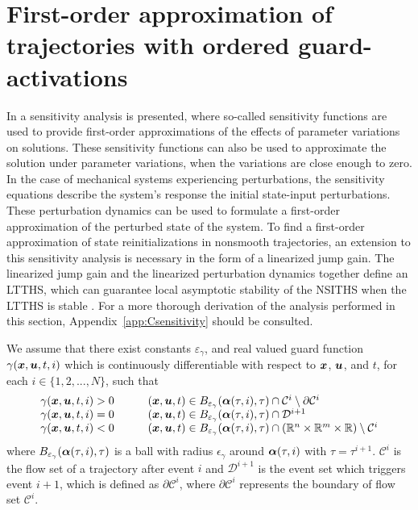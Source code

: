 \documentclass[../DC2017114Bouma.tex]{subfiles}
\begin{document}
\section{First-order approximation of trajectories with ordered guard-activations}
In \cite{Khalil1996} a sensitivity analysis is presented, where so-called sensitivity functions are used to provide first-order approximations of the effects of parameter variations on solutions. These sensitivity functions can also be used to approximate the solution under parameter variations, when the variations are close enough to zero. In the case of mechanical systems experiencing perturbations, the sensitivity equations describe the system's response the initial state-input perturbations. These perturbation dynamics can be used to formulate a first-order approximation of the perturbed state of the system. To find a first-order approximation of state reinitializations in nonsmooth trajectories, an extension to this sensitivity analysis is necessary in the form of a linearized jump gain. The linearized jump gain and the linearized perturbation dynamics together define an LTTHS, which can guarantee local asymptotic stability of the NSITHS when the LTTHS is stable \cite{Rijnen2017}. For a more thorough derivation of the analysis performed in this section, Appendix~\ref{app:Csensitivity} should be consulted.

\begin{myass}\label{ass:existence}
We assume that there exist constants $\varepsilon_\gamma$, and real valued guard function $\gamma({\boldsymbol{x}},{\boldsymbol{u}},t,i)$ which is continuously differentiable with respect to ${\boldsymbol{x}}$, ${\boldsymbol{u}}$, and $t$, for each $i\in \{1,2,...,N\}$, such that
\begin{equation}
\begin{array}{llll}
\gamma({\boldsymbol{x}},{\boldsymbol{u}},t,i) > 0 & &	&({\boldsymbol{x}},{\boldsymbol{u}},t) \in B_{\varepsilon_\gamma}(\boldsymbol{\alpha}(\tau,i),\tau)\cap \mathcal{C}^i\setminus\partial \mathcal{C}^i\\
\gamma({\boldsymbol{x}},{\boldsymbol{u}},t,i) = 0 & &	&({\boldsymbol{x}},{\boldsymbol{u}},t) \in B_{\varepsilon_\gamma}(\boldsymbol{\alpha}(\tau,i),\tau)\cap \mathcal{D}^{i+1}\\
\gamma({\boldsymbol{x}},{\boldsymbol{u}},t,i) < 0 & &	&({\boldsymbol{x}},{\boldsymbol{u}},t) \in B_{\varepsilon_\gamma}(\boldsymbol{\alpha}(\tau,i),\tau)\cap (\mathbb{R}^n \times \mathbb{R}^m \times \mathbb{R})\setminus \mathcal{C}^i
\end{array}
\end{equation}
where $B_{\varepsilon_{\gamma}}(\boldsymbol{\alpha}(\tau,i),\tau)$ is a ball with radius $\epsilon_{\gamma}$ around $\boldsymbol{\alpha}(\tau,i)$ with $\tau = \tau^{i+1}$. $\mathcal{C}^i$ is the flow set of a trajectory after event $i$ and $\mathcal{D}^{i+1}$ is the event set which triggers event $i+1$, which is defined as $\partial \mathcal{C}^i$, where $\partial \mathcal{C}^i$ represents the boundary of flow set $\mathcal{C}^i$.
\end{myass}
\end{document}
